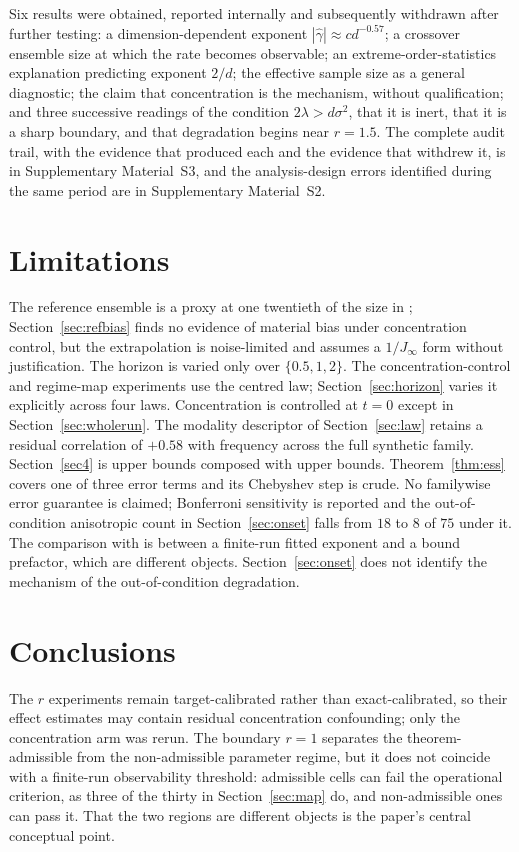 \documentclass[pdflatex,sn-mathphys-num]{sn-jnl}
\theoremstyle{thmstyleone}
\theoremstyle{thmstyletwo}
\theoremstyle{thmstylethree}
\begin{document}
Six results were obtained, reported internally and subsequently withdrawn after further testing: a dimension-dependent exponent $|\hat\gamma|\approx cd^{-0.57}$; a crossover ensemble size at which the rate becomes observable; an extreme-order-statistics explanation predicting exponent $2/d$; the effective sample size as a general diagnostic; the claim that concentration is the mechanism, without qualification; and three successive readings of the condition $2\lambda>d\sigma^2$, that it is inert, that it is a sharp boundary, and that degradation begins near $r=1.5$. The complete audit trail, with the evidence that produced each and the evidence that withdrew it, is in Supplementary Material~S3, and the analysis-design errors identified during the same period are in Supplementary Material~S2.

\section{Limitations}\label{sec10}

The reference ensemble is a proxy at one twentieth of the size in \cite{ghv2025}; Section~\ref{sec:refbias} finds no evidence of material bias under concentration control, but the extrapolation is noise-limited and assumes a $1/J_\infty$ form without justification. The horizon is varied only over $\{0.5,1,2\}$. The concentration-control and regime-map experiments use the centred law; Section~\ref{sec:horizon} varies it explicitly across four laws. Concentration is controlled at $t=0$ except in Section~\ref{sec:wholerun}. The modality descriptor of Section~\ref{sec:law} retains a residual correlation of $+0.58$ with frequency across the full synthetic family. Section~\ref{sec4} is upper bounds composed with upper bounds. Theorem~\ref{thm:ess} covers one of three error terms and its Chebyshev step is crude. No familywise error guarantee is claimed; Bonferroni sensitivity is reported and the out-of-condition anisotropic count in Section~\ref{sec:onset} falls from $18$ to $8$ of $75$ under it. The comparison with \cite{ghkv2025} is between a finite-run fitted exponent and a bound prefactor, which are different objects. Section~\ref{sec:onset} does not identify the mechanism of the out-of-condition degradation.

\section{Conclusions}\label{sec11}

The $r$ experiments remain target-calibrated rather than exact-calibrated, so their effect estimates may contain residual concentration confounding; only the concentration arm was rerun. The boundary $r=1$ separates the theorem-admissible from the non-admissible parameter regime, but it does not coincide with a finite-run observability threshold: admissible cells can fail the operational criterion, as three of the thirty in Section~\ref{sec:map} do, and non-admissible ones can pass it. That the two regions are different objects is the paper's central conceptual point.
\end{document}
